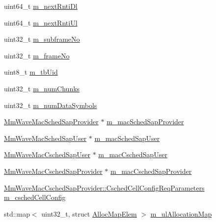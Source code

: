 \begin{DoxyCompactItemize}
uint64\+\_\+t \hyperlink{classns3_1_1MmWaveFlexTtiMacScheduler_a8ff812f1c85c8c9ec3d0eba88e7c090a}{m\+\_\+next\+Rnti\+Dl}
\item 
uint64\+\_\+t \hyperlink{classns3_1_1MmWaveFlexTtiMacScheduler_a1f7e10e2f29bb79dfda9b0a606cf2521}{m\+\_\+next\+Rnti\+Ul}
\item 
uint32\+\_\+t \hyperlink{classns3_1_1MmWaveFlexTtiMacScheduler_a9f790561b67edeeded0a412a4a138d46}{m\+\_\+subframe\+No}
\item 
uint32\+\_\+t \hyperlink{classns3_1_1MmWaveFlexTtiMacScheduler_a2e6fbd15c0a59c6e457ffc98115240d0}{m\+\_\+frame\+No}
\item 
uint8\+\_\+t \hyperlink{classns3_1_1MmWaveFlexTtiMacScheduler_a6164b3a4d99c83b291b54104a29ecaad}{m\+\_\+tb\+Uid}
\item 
uint32\+\_\+t \hyperlink{classns3_1_1MmWaveFlexTtiMacScheduler_a001b046258e0f7c59a1a56ef3f17e4fd}{m\+\_\+num\+Chunks}
\item 
uint32\+\_\+t \hyperlink{classns3_1_1MmWaveFlexTtiMacScheduler_a3839eaff4760d05fbf73a1ee7cce4a30}{m\+\_\+num\+Data\+Symbols}
\item 
\hyperlink{classns3_1_1MmWaveMacSchedSapProvider}{Mm\+Wave\+Mac\+Sched\+Sap\+Provider} $\ast$ \hyperlink{classns3_1_1MmWaveFlexTtiMacScheduler_ab875c09c3c126085817a97f294fe5b97}{m\+\_\+mac\+Sched\+Sap\+Provider}
\item 
\hyperlink{classns3_1_1MmWaveMacSchedSapUser}{Mm\+Wave\+Mac\+Sched\+Sap\+User} $\ast$ \hyperlink{classns3_1_1MmWaveFlexTtiMacScheduler_aea2c0392508e0b7f0a582d20c7068e84}{m\+\_\+mac\+Sched\+Sap\+User}
\item 
\hyperlink{classns3_1_1MmWaveMacCschedSapUser}{Mm\+Wave\+Mac\+Csched\+Sap\+User} $\ast$ \hyperlink{classns3_1_1MmWaveFlexTtiMacScheduler_a84429fa6a8656738b680cd1459ff1090}{m\+\_\+mac\+Csched\+Sap\+User}
\item 
\hyperlink{classns3_1_1MmWaveMacCschedSapProvider}{Mm\+Wave\+Mac\+Csched\+Sap\+Provider} $\ast$ \hyperlink{classns3_1_1MmWaveFlexTtiMacScheduler_a53e42b8008f2a568ae121ffd4a7f64fc}{m\+\_\+mac\+Csched\+Sap\+Provider}
\item 
\hyperlink{structns3_1_1MmWaveMacCschedSapProvider_1_1CschedCellConfigReqParameters}{Mm\+Wave\+Mac\+Csched\+Sap\+Provider\+::\+Csched\+Cell\+Config\+Req\+Parameters} \hyperlink{classns3_1_1MmWaveFlexTtiMacScheduler_ac33eb963cd43d583dcbf8222d78fa2ed}{m\+\_\+csched\+Cell\+Config}
\item 
std\+::map$<$ uint32\+\_\+t, struct \hyperlink{structns3_1_1MmWaveFlexTtiMacScheduler_1_1AllocMapElem}{Alloc\+Map\+Elem} $>$ \hyperlink{classns3_1_1MmWaveFlexTtiMacScheduler_ada4413d6867aaf28c116833458a62ea4}{m\+\_\+ul\+Allocation\+Map}

\end{DoxyCompactItemize}
